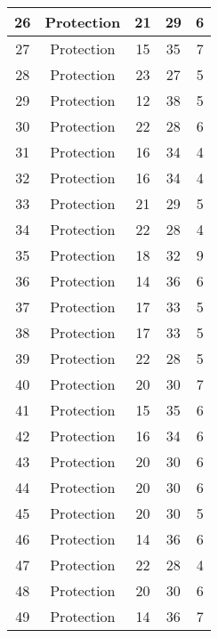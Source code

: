 \documentclass[results.tex]{subfiles}
\begin{document}
\begin{center}
\begin{tabular}{| c || c | c | c | c |}
    \hline
    26 & Protection & 21 & 29 & 6 \\ 
    \hline
    27 & Protection & 15 & 35 & 7 \\ 
    \hline
    28 & Protection & 23 & 27 & 5 \\ 
    \hline
    29 & Protection & 12 & 38 & 5 \\ 
    \hline
    30 & Protection & 22 & 28 & 6 \\ 
    \hline
    31 & Protection & 16 & 34 & 4 \\ 
    \hline
    32 & Protection & 16 & 34 & 4 \\ 
    \hline
    33 & Protection & 21 & 29 & 5 \\ 
    \hline
    34 & Protection & 22 & 28 & 4 \\ 
    \hline
    35 & Protection & 18 & 32 & 9 \\ 
    \hline
    36 & Protection & 14 & 36 & 6 \\ 
    \hline
    37 & Protection & 17 & 33 & 5 \\ 
    \hline
    38 & Protection & 17 & 33 & 5 \\ 
    \hline
    39 & Protection & 22 & 28 & 5 \\ 
    \hline
    40 & Protection & 20 & 30 & 7 \\ 
    \hline
    41 & Protection & 15 & 35 & 6 \\ 
    \hline
    42 & Protection & 16 & 34 & 6 \\ 
    \hline
    43 & Protection & 20 & 30 & 6 \\ 
    \hline
    44 & Protection & 20 & 30 & 6 \\ 
    \hline
    45 & Protection & 20 & 30 & 5 \\ 
    \hline
    46 & Protection & 14 & 36 & 6 \\ 
    \hline
    47 & Protection & 22 & 28 & 4 \\ 
    \hline
    48 & Protection & 20 & 30 & 6 \\ 
    \hline
    49 & Protection & 14 & 36 & 7 \\ 
    \hline   \end{tabular}
\end{center}
\end{document}
